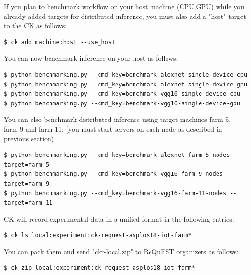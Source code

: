 \documentclass[sigplan]{acmart}
\begin{document}
If you plan to benchmark workflow on your host machine (CPU,GPU) while you already added targets for distributed inference, 
you must also add a "host" target to the CK as follows:
\begin{verbatim}
$ ck add machine:host --use_host
\end{verbatim}

You can now benchmark inference on your host as follows:
\begin{verbatim}
$ python benchmarking.py --cmd_key=benchmark-alexnet-single-device-cpu
$ python benchmarking.py --cmd_key=benchmark-alexnet-single-device-gpu
$ python benchmarking.py --cmd_key=benchmark-vgg16-single-device-cpu
$ python benchmarking.py --cmd_key=benchmark-vgg16-single-device-gpu
\end{verbatim}

You can also benchmark distributed inference using target machines farm-5, farm-9 and farm-11:
(you must start servers on each node as described in previous section)
\begin{verbatim}
$ python benchmarking.py --cmd_key=benchmark-alexnet-farm-5-nodes --target=farm-5
$ python benchmarking.py --cmd_key=benchmark-vgg16-farm-9-nodes --target=farm-9
$ python benchmarking.py --cmd_key=benchmark-vgg16-farm-11-nodes --target=farm-11
\end{verbatim}

CK will record experimental data in a unified format in the following entries:
\begin{verbatim}
$ ck ls local:experiment:ck-request-asplos18-iot-farm*
\end{verbatim}

You can pack them and send "ckr-local.zip" to ReQuEST organizers as follows:
\begin{verbatim}
$ ck zip local:experiment:ck-request-asplos18-iot-farm*
\end{verbatim}
\end{document}
